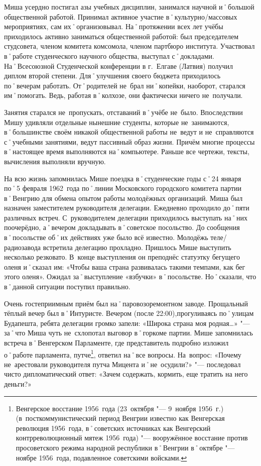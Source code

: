 Миша усердно постигал азы учебных дисциплин, занимался научной и˚большой общественной работой. Принимал активное участие в˚культурно\-/массовых мероприятиях, сам их˚организовывал. На˚протяжении всех лет учёбы приходилось активно заниматься общественной работой: был председателем студсовета, членом комитета комсомола, членом партбюро института. Участвовал в˚работе студенческого научного общества, выступал с˚докладами. На˚Всесоюзной Студенческой конференции в г.~Елгаве (Латвия) получил диплом второй степени. Для˚улучшения своего бюджета приходилось по˚вечерам работать. От˚родителей не~брал ни˚копейки, наоборот, старался им˚помогать. Ведь, работая в˚колхозе, они фактически ничего не~получали. 

Занятия старался не~пропускать, отставаний в˚учёбе не~было. Впоследствии Мишу удивляли отдельные нынешние студенты, которые не~занимаются, в˚большинстве своём никакой общественной работы не~ведут и не~справляются с˚учебными занятиями, ведут пассивный образ жизни. Причём многие процессы в˚настоящее время  выполняются на˚компьютере. Раньше все чертежи, тексты, вычисления выполняли вручную.

На всю жизнь запомнилась Мише поездка в˚студенческие годы с˚24 января по˚5 февраля 1962~года по˚линии Московского городского комитета партии в˚Венгрию для обмена опытом работы молодёжных организаций. Миша был назначен заместителем руководителя делегации. Ежедневно проходило до˚пяти различных встреч. С~руководителем делегации приходилось выступать на˚них поочерёдно, а˚вечером докладывать в˚советское посольство. До сообщения в˚посольстве об˚их действиях уже было всё известно. Молодёжь теле\-/радиозавода встретила делегацию прохладно. Пришлось Мише выступить несколько резковато. В~конце выступления он преподнёс статуэтку бегущего оленя и˚сказал им: «Чтобы ваша страна развивалась такими темпами, как бег этого оленя». Ожидал за˚выступление «взбучки» в˚посольстве. Но˚сказали, что в˚данной ситуации поступил правильно. 

Очень гостеприимным приём был на˚паровозоремонтном заводе. Прощальный тёплый вечер был в˚Интуристе. Вечером (после 22:00),прогуливаясь по˚улицам Будапешта, ребята делегации громко запели: «Широка страна моя родная…» "--- за˚что Миша чуть не~схлопотал выговор в˚горкоме партии. Мише запомнилась встреча в˚Венгерском Парламенте, где представитель подробно изложил о˚работе парламента, путче\footnote{Венгерское восстание 1956~года (23~октября "--- 9~ноября 1956~г.) (в~посткоммунистический период Венгрии известно как Венгерская революция 1956~года, в˚советских источниках как Венгерский контрреволюционный мятеж 1956~года) "--- вооружённое восстание против просоветского режима народной республики в˚Венгрии в˚октябре "--- ноябре 1956~года, подавленное советскими войсками.}, ответил на˚все вопросы. На~вопрос: «Почему не~арестовали руководителя путча Мицента и˚не~осудили?» "--- последовал чисто дипломатический ответ: «Зачем содержать, кормить, еще тратить на него деньги?»


